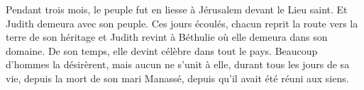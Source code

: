 Pendant trois mois, le peuple fut en liesse à Jérusalem devant le Lieu saint.
	Et Judith demeura avec son peuple.
Ces jours écoulés, chacun reprit la route vers la terre de son héritage
	et Judith revint à Béthulie où elle demeura dans son domaine.
De son temps, elle devint célèbre dans tout le pays.
Beaucoup d'hommes la désirèrent,
	mais aucun ne s'unit à elle, durant tous les jours de sa vie,
	depuis la mort de son mari Manassé, depuis qu'il avait été réuni aux siens.
